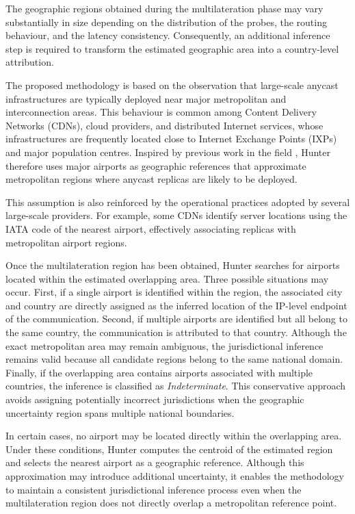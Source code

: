 The geographic regions obtained during the multilateration phase may vary substantially in size depending on the distribution of the probes, the routing behaviour, and the latency consistency. Consequently, an additional inference step is required to transform the estimated geographic area into a country-level attribution.

The proposed methodology is based on the observation that large-scale anycast infrastructures are typically deployed near major metropolitan and interconnection areas. This behaviour is common among Content Delivery Networks (CDNs), cloud providers, and distributed Internet services, whose infrastructures are frequently located close to Internet Exchange Points (IXPs) and major population centres. Inspired by previous work in the field \cite{Cicalese2016Latency-BasedSets}, Hunter therefore uses major airports as geographic references that approximate metropolitan regions where anycast replicas are likely to be deployed.

This assumption is also reinforced by the operational practices adopted by several large-scale providers. For example, some CDNs identify server locations using the IATA code of the nearest airport, effectively associating replicas with metropolitan airport regions.

Once the multilateration region has been obtained, Hunter searches for airports located within the estimated overlapping area. Three possible situations may occur. First, if a single airport is identified within the region, the associated city and country are directly assigned as the inferred location of the IP-level endpoint of the communication. Second, if multiple airports are identified but all belong to the same country, the communication is attributed to that country. Although the exact metropolitan area may remain ambiguous, the jurisdictional inference remains valid because all candidate regions belong to the same national domain. Finally, if the overlapping area contains airports associated with multiple countries, the inference is classified as \textit{Indeterminate}. This conservative approach avoids assigning potentially incorrect jurisdictions when the geographic uncertainty region spans multiple national boundaries.

In certain cases, no airport may be located directly within the overlapping area. Under these conditions, Hunter computes the centroid of the estimated region and selects the nearest airport as a geographic reference. Although this approximation may introduce additional uncertainty, it enables the methodology to maintain a consistent jurisdictional inference process even when the multilateration region does not directly overlap a metropolitan reference point.

